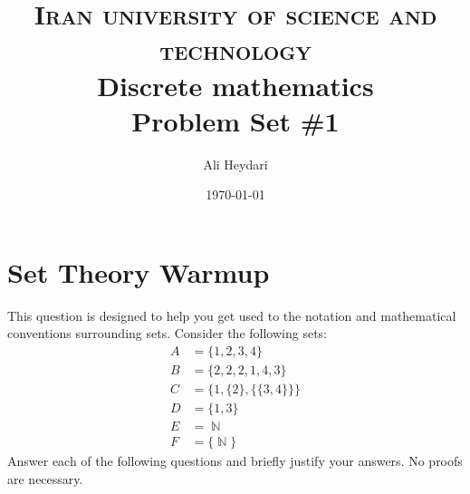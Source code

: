 \documentclass{article}
\title{
\textsc{Iran university of science and technology} \\ [25pt] %
Discrete mathematics\\Problem Set \#1 \\
}
\author{Ali Heydari}
\date{\today}
\renewcommand{\(}{\left(}
\renewcommand{\)}{\right)}
\DeclareMathOperator{\N}{\mathbb{N}}
\theoremstyle{plain}
\theoremstyle{plain}
\theoremstyle{definition}
\begin{document}
\maketitle

\section{Set Theory Warmup}

This question is designed to help you get used to the notation and mathematical
conventions surrounding sets.
Consider the following sets:
\begin{align*}
A &= \{1, 2, 3, 4\} \\
B &= \{2, 2, 2, 1, 4, 3\} \\
C &= \{1, \{2\}, \{\{3, 4\}\}\} \\
D &= \{1, 3\} \\
E &= \N \\
F &= \{\N\}
\end{align*}
Answer each of the following questions and briefly justify your answers.
No proofs are necessary.
\end{document}
